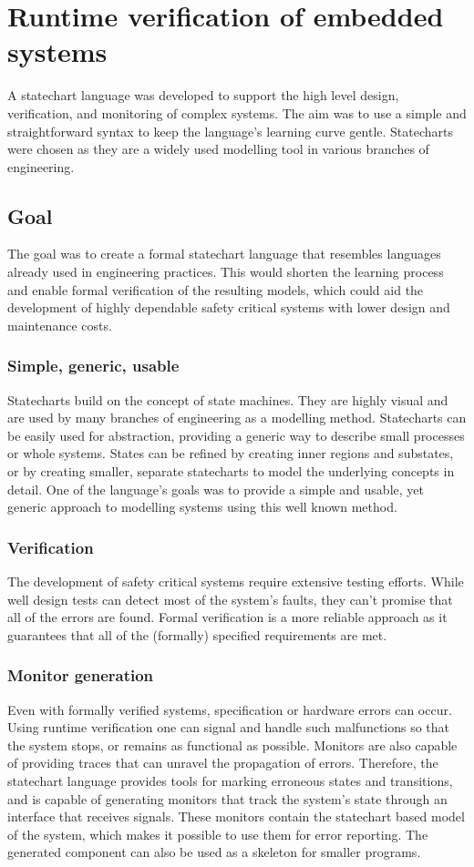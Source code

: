 \chapter{Runtime verification of embedded systems}
\label{chap:runtime_verification}
A statechart language was developed to support the high level design, verification, and monitoring of complex systems. The aim was to use a simple and straightforward syntax to keep the language’s learning curve gentle. Statecharts were chosen as they are a widely used modelling tool in various branches of engineering.
\section{Goal}
The goal was to create a formal statechart language that resembles languages already used in engineering practices. This would shorten the learning process and enable formal verification of the resulting models, which could aid the development of highly dependable safety critical systems with lower design and maintenance costs.
  \subsection{Simple, generic, usable}
Statecharts build on the concept of state machines. They are highly visual and are used by many branches of engineering as a modelling method. Statecharts can be easily used for abstraction, providing a generic way to describe small processes or whole systems. States can be refined by creating inner regions and substates, or by creating smaller, separate statecharts to model the underlying concepts in detail. One of the language's goals was to provide a simple and usable, yet generic approach to modelling systems using this well known method.
  \subsection{Verification}
The development of safety critical systems require extensive testing efforts. While well design tests can detect most of the system's faults, they can't promise that all of the errors are found. Formal verification is a more reliable approach as it guarantees that all of the (formally) specified requirements are met.
  \subsection{Monitor generation}
Even with formally verified systems, specification or hardware errors can occur. Using runtime verification one can signal and handle such malfunctions so that the system stops, or remains as functional as possible. Monitors are also capable of providing traces that can unravel the propagation of errors. Therefore, the statechart language provides tools for marking erroneous states and transitions, and is capable of generating monitors that track the system's state through an interface that receives signals. These monitors contain the statechart based model of the system, which makes it possible to use them for error reporting. The generated component can also be used as a skeleton for smaller programs.
